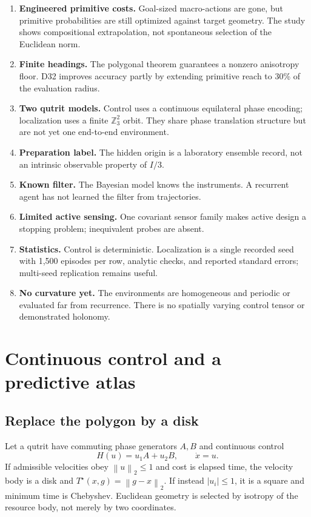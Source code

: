 \documentclass[11pt]{article}
\theoremstyle{definition}\newtheorem{definition}[theorem]{Definition}
\theoremstyle{remark}\newtheorem{remark}[theorem]{Remark}
\newcommand{\Z}{\mathbb Z}
\newcommand{\norm}[1]{\left\lVert #1\right\rVert}
\newcommand{\abs}[1]{\left\lvert #1\right\rvert}
\begin{document}
\begin{enumerate}[leftmargin=2em]
\item \textbf{Engineered primitive costs.} Goal-sized macro-actions are gone,
but primitive probabilities are still optimized against target geometry.
The study shows compositional extrapolation, not spontaneous selection of the
Euclidean norm.
\item \textbf{Finite headings.} The polygonal theorem guarantees a nonzero
anisotropy floor. D32 improves accuracy partly by extending primitive reach to
30\% of the evaluation radius.
\item \textbf{Two qutrit models.} Control uses a continuous equilateral phase
encoding; localization uses a finite \(\Z_3^2\) orbit. They share phase
translation structure but are not yet one end-to-end environment.
\item \textbf{Preparation label.} The hidden origin is a laboratory ensemble
record, not an intrinsic observable property of \(I/3\).
\item \textbf{Known filter.} The Bayesian model knows the instruments. A
recurrent agent has not learned the filter from trajectories.
\item \textbf{Limited active sensing.} One covariant sensor family makes
active design a stopping problem; inequivalent probes are absent.
\item \textbf{Statistics.} Control is deterministic. Localization is a
single recorded seed with 1,500 episodes per row, analytic checks, and
reported standard errors; multi-seed replication remains useful.
\item \textbf{No curvature yet.} The environments are homogeneous and
periodic or evaluated far from recurrence. There is no spatially varying
control tensor or demonstrated holonomy.
\end{enumerate}

\section{Continuous control and a predictive atlas}
\label{sec:outlook}

\subsection{Replace the polygon by a disk}

Let a qutrit have commuting phase generators \(A,B\) and continuous control
\begin{equation}
H(u)=u_1A+u_2B,\qquad \dot x=u.
\label{eq:continuous}
\end{equation}
If admissible velocities obey \(\norm u_2\le1\) and cost is elapsed time, the
velocity body is a disk and \(T^\star(x,g)=\norm{g-x}_2\). If instead
\(\abs{u_i}\le1\), it is a square and minimum time is Chebyshev. Euclidean
geometry is selected by isotropy of the resource body, not merely by two
coordinates.
\end{document}

